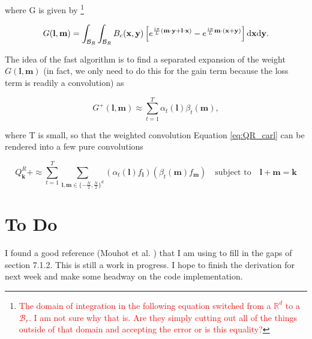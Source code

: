\documentclass{article}
\def\t{\text}
\def\b{\mathbf}
\begin{document}
where G is given by \footnote{\textcolor{red}{The domain of integration in the following equation switched from a $\mathbb{R}^d$ to a $\mathcal{B}_r$. I am not sure why that is. Are they simply cutting out all of the things outside of that domain and accepting the error or is this equality?}}

\begin{equation} \label{eq:Glm_carl}
    G(\b l, \b m) = \int_{\mathcal{B}_R} \int_{\mathcal{B}_R} B_c(\b x, \b y) \left[  e^{\frac{i \pi}{L} (\b m \cdot \b y + \b l \cdot \b x) } - e^{\frac{i \pi}{L} \b m \cdot (\b x + \b y)} \right] \t d \b x \t d \b y.
\end{equation}

The idea of the fast algorithm is to find a separated expansion of the weight $G(\b l, \b m)$ (in fact, we only need to do this for the gain term because the loss term is readily a convolution) as

\[
    G^+(\b l, \b m) \approx \sum_{t = 1}^T \alpha_t(\b l) \beta_t(\b m),
\]

where T is small, so that the weighted convolution Equation \ref{eq:QR_carl} can be rendered into a few pure convolutions

\[
    Q_{\b k}^R+ \approx \sum_{t=1}^T \sum_{\b l,\b m \in \{-\frac{N}{2}, \frac{N}{2}\}^d} (\alpha_t(\b l) f_{\b l})(\beta_t(\b m) f_{\b m})  \quad \text{subject to} \quad \b l + \b m = \b k
\]

\section{To Do}

I found a good reference (Mouhot et al. \cite{Mouhot_2006}) that I am using to fill in the gaps of section 7.1.2. This is still a work in progress. I hope to finish the derivation for next week and make some headway on the code implementation.


\end{document}
